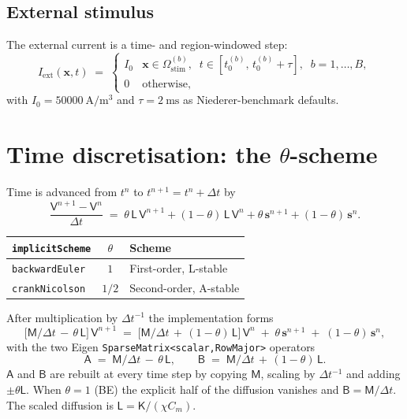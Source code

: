 \documentclass[11pt,a4paper]{article}
\newcommand{\Iext}{I_{\text{ext}}}
\newcommand{\Aimp}{\mathsf{A}}
\newcommand{\Bimp}{\mathsf{B}}
\newcommand{\Mmass}{\mathsf{M}}
\newcommand{\Kstif}{\mathsf{K}}
\newcommand{\Lop}{\mathsf{L}}
\newcommand{\code}[1]{\texttt{\small #1}}
\begin{document}
\subsection{External stimulus}

The external current is a time- and region-windowed step:
\begin{equation}
  \Iext(\mathbf{x}, t) \;=\;
  \begin{cases}
    I_{0} & \mathbf{x} \in \Omega_{\text{stim}}^{(b)},
            \;\; t \in [t_{0}^{(b)},\, t_{0}^{(b)} + \tau],
            \;\; b = 1, \dots, B, \\
    0     & \text{otherwise},
  \end{cases}
\end{equation}
with $I_{0} = \SI{50000}{\ampere\per\meter\cubed}$ and
$\tau = \SI{2}{\milli\second}$ as Niederer-benchmark defaults.

\section{Time discretisation: the $\theta$-scheme}

Time is advanced from $t^{n}$ to $t^{n+1} = t^{n} + \Delta t$ by
\begin{equation}
  \frac{\mathsf{V}^{n+1} - \mathsf{V}^{n}}{\Delta t}
   \;=\;
   \theta\, \Lop\, \mathsf{V}^{n+1}
   + (1-\theta)\, \Lop\, \mathsf{V}^{n}
   + \theta\, \mathbf{s}^{n+1}
   + (1-\theta)\, \mathbf{s}^{n}.
   \label{eq:theta}
\end{equation}

\begin{center}
\begin{tabular}{@{}lcl@{}}
\toprule
\code{implicitScheme} & $\theta$ & Scheme \\
\midrule
\code{backwardEuler} & $1$   & First-order, L-stable \\
\code{crankNicolson} & $1/2$ & Second-order, A-stable \\
\bottomrule
\end{tabular}
\end{center}

After multiplication by $\Delta t^{-1}$ the implementation forms
\begin{equation}
  \bigl[\Mmass/\Delta t \,-\, \theta\, \Lop\bigr]\, \mathsf{V}^{n+1}
   \;=\;
   \bigl[\Mmass/\Delta t \,+\, (1-\theta)\, \Lop\bigr]\, \mathsf{V}^{n}
   \;+\; \theta\, \mathbf{s}^{n+1}
   \;+\; (1-\theta)\, \mathbf{s}^{n},
   \label{eq:implicit-system}
\end{equation}
with the two Eigen \code{SparseMatrix<scalar,RowMajor>} operators
\begin{equation}
  \Aimp \;=\; \Mmass/\Delta t \,-\, \theta\, \Lop,
   \qquad
  \Bimp \;=\; \Mmass/\Delta t \,+\, (1-\theta)\, \Lop.
   \label{eq:AB}
\end{equation}
$\Aimp$ and $\Bimp$ are rebuilt at every time step by copying $\Mmass$,
scaling by $\Delta t^{-1}$ and adding $\pm \theta \Lop$. When
$\theta = 1$ (BE) the explicit half of the diffusion vanishes and
$\Bimp = \Mmass/\Delta t$. The scaled diffusion is
$\Lop = \Kstif / (\chi C_{m})$.
\end{document}
